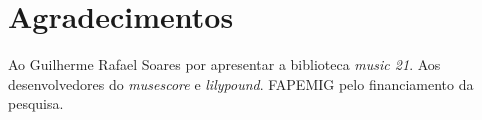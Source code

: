 \section{Agradecimentos}

Ao Guilherme Rafael Soares por apresentar a biblioteca \emph{music 21}. Aos desenvolvedores do \emph{musescore} e \emph{lilypound}. FAPEMIG pelo financiamento da pesquisa.